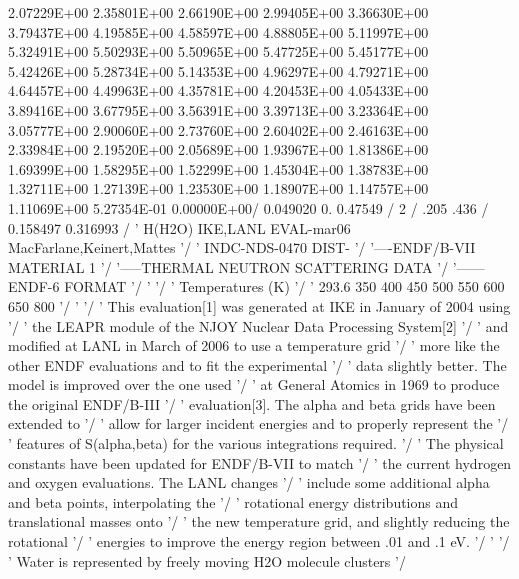 \begin{ccode}
  2.07229E+00  2.35801E+00  2.66190E+00  2.99405E+00  3.36630E+00
  3.79437E+00  4.19585E+00  4.58597E+00  4.88805E+00  5.11997E+00
  5.32491E+00  5.50293E+00  5.50965E+00  5.47725E+00  5.45177E+00
  5.42426E+00  5.28734E+00  5.14353E+00  4.96297E+00  4.79271E+00
  4.64457E+00  4.49963E+00  4.35781E+00  4.20453E+00  4.05433E+00
  3.89416E+00  3.67795E+00  3.56391E+00  3.39713E+00  3.23364E+00
  3.05777E+00  2.90060E+00  2.73760E+00  2.60402E+00  2.46163E+00
  2.33984E+00  2.19520E+00  2.05689E+00  1.93967E+00  1.81386E+00
  1.69399E+00  1.58295E+00  1.52299E+00  1.45304E+00  1.38783E+00
  1.32711E+00  1.27139E+00  1.23530E+00  1.18907E+00  1.14757E+00
  1.11069E+00  5.27354E-01  0.00000E+00/
    0.049020  0.   0.47549 /
    2 /
   .205  .436 /
   0.158497        0.316993  /
  ' H(H2O)    IKE,LANL   EVAL-mar06 MacFarlane,Keinert,Mattes        '/
  ' INDC-NDS-0470        DIST-                                       '/
  '----ENDF/B-VII        MATERIAL    1                               '/
  '-----THERMAL NEUTRON SCATTERING DATA                              '/
  '------ENDF-6 FORMAT                                               '/
  '                                                                  '/
  ' Temperatures (K)                                                 '/
  '         293.6  350  400  450  500  550  600  650  800            '/
  '                                                                  '/
  ' This evaluation[1] was generated at IKE in January of 2004 using '/
  ' the LEAPR module of the NJOY Nuclear Data Processing System[2]   '/
  ' and modified at LANL in March of 2006 to use a temperature grid  '/
  ' more like the other ENDF evaluations and to fit the experimental '/
  ' data slightly better.  The model is improved over the one used   '/
  ' at General Atomics in 1969 to produce the original ENDF/B-III    '/
  ' evaluation[3].  The alpha and beta grids have been extended to   '/
  ' allow for larger incident energies and to properly represent the '/
  ' features of S(alpha,beta) for the various integrations required. '/
  ' The physical constants have been updated for ENDF/B-VII to match '/
  ' the current hydrogen and oxygen evaluations.  The LANL changes   '/
  ' include some additional alpha and beta points, interpolating the '/
  ' rotational energy distributions and translational masses onto    '/
  ' the new temperature grid, and slightly reducing the rotational   '/
  ' energies to improve the energy region between .01 and .1 eV.     '/
  '                                                                  '/
  ' Water is represented by freely moving H2O molecule clusters      '/

\end{ccode}
